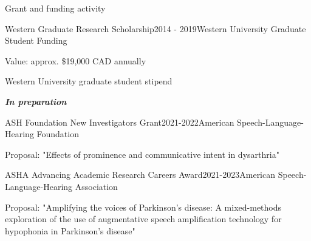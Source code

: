 \documentclass{resume} %
\begin{document}
\begin{rSection}{Grant and funding activity}
\begin{rSubsection}{Western Graduate Research Scholarship}{2014 - 2019}{Western University Graduate Student Funding}{} %
	\item Value: approx. \$19,000 CAD annually
	\item Western University graduate student stipend
\end{rSubsection}

\begin{center}
	{\bf \emph{In preparation}}
\end{center}

\begin{rSubsection}{ASH Foundation New Investigators Grant}{2021-2022}{American Speech-Language-Hearing Foundation}{}
	\item Proposal: "Effects of prominence and communicative intent in dysarthria"
\end{rSubsection}

\begin{rSubsection}{ASHA Advancing Academic Research Careers Award}{2021-2023}{American Speech-Language-Hearing Association}{}
	\item Proposal: "Amplifying the voices of Parkinson’s disease: A mixed-methods exploration of the use of augmentative speech amplification technology for hypophonia in Parkinson’s disease"
\end{rSubsection}


\end{rSection}
\end{document}
